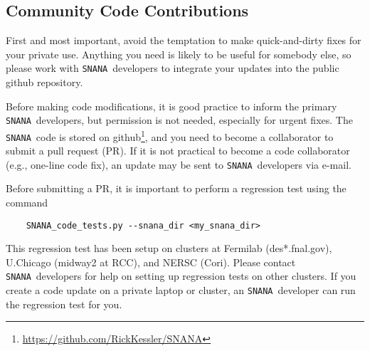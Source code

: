 \documentclass[12pt]{article}
\newcommand{\snana}{{\tt SNANA}}
\newcommand{\SNANA}{{\tt SNANA}}
\begin{document}
{%
\clearpage
\subsection{Community Code Contributions}
\label{subsec:code_contributor}

First and most important, avoid the temptation to make quick-and-dirty
fixes for your private use. Anything you need is likely to be useful
for somebody else, so please work with \SNANA\ developers to integrate
your updates into the public github repository.

Before making code modifications, it is good practice to 
inform the primary \snana\ developers, but permission is not
needed, especially for urgent fixes.
The \snana\ code is stored on 
  github\footnote{\url{https://github.com/RickKessler/SNANA}},
and you need to become a collaborator to submit a pull request (PR).
If it is not practical to become a code collaborator
(e.g., one-line code fix),
an update may be sent to \SNANA\ developers via e-mail.

Before submitting a PR, it is important to perform
a regression test using the command
\begin{verbatim}
    SNANA_code_tests.py --snana_dir <my_snana_dir>
\end{verbatim}
%
This regression test has been setup on clusters at 
Fermilab (des*.fnal.gov), U.Chicago (midway2 at RCC), and NERSC (Cori).
Please contact \SNANA\ developers for help on setting up
regression tests on other clusters. If you create a code update 
on a private laptop or cluster, 
an \SNANA\ developer can run the regression test for you.

}
\end{document}
